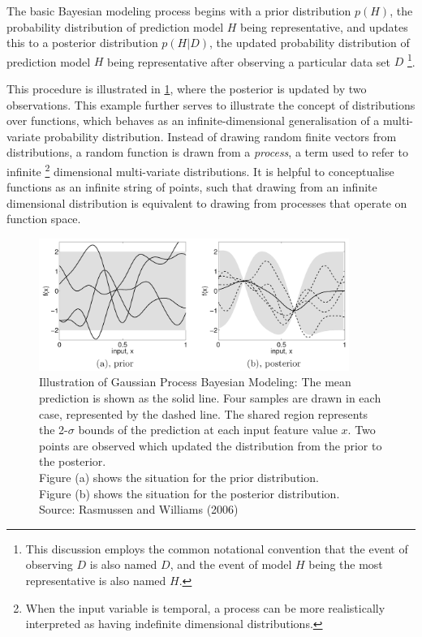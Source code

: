 			The basic Bayesian modeling process begins with a prior distribution $p(H)$, the probability distribution of prediction model $H$ being representative, and updates this to a posterior distribution $p(H | D)$, the updated probability distribution of prediction model $H$ being representative after observing a particular data set $D$ \footnote{This discussion employs the common notational convention that the event of observing $D$ is also named $D$, and the event of model $H$ being the most representative is also named $H$.}. 
			
			This procedure is illustrated in \cref{Background:OceanEnvironmentModeling:Figure:bayesianmodeling}, where the posterior is updated by two observations. This example further serves to illustrate the concept of distributions over functions, which behaves as an infinite-dimensional generalisation of a multi-variate probability distribution. Instead of drawing random finite vectors from distributions, a random function is drawn from a \textit{process}, a term used to refer to infinite \footnote{When the input variable is temporal, a process can be more realistically interpreted as having indefinite dimensional distributions.} dimensional multi-variate distributions. It is helpful to conceptualise functions as an infinite string of points, such that drawing from an infinite dimensional distribution is equivalent to drawing from processes that operate on function space.
			
			\begin{figure}[!htbp]
				\centering
					\includegraphics[width=0.9\textwidth]{Figures/bayesianmodeling.png}
				\caption{Illustration of Gaussian Process Bayesian Modeling: The mean prediction is shown as the solid line. Four samples are drawn in each case, represented by the dashed line. The shared region represents the 2-$\sigma$ bounds of the prediction at each input feature value $x$. Two points are observed which updated the distribution from the prior to the posterior.\\
				Figure (a) shows the situation for the prior distribution.\\
				Figure (b) shows the situation for the posterior distribution. \\
				Source: Rasmussen and Williams (2006) \cite{GaussianProcessForMachineLearning}}
				\label{Background:OceanEnvironmentModeling:Figure:bayesianmodeling}
			\end{figure}
			
